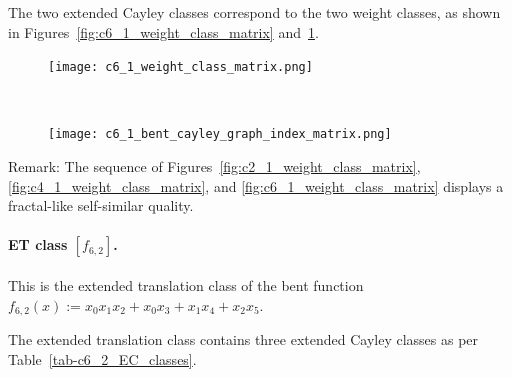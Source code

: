 \documentclass[12pt,a4paper]{article}
\begin{document}

The two extended Cayley classes correspond to the two weight classes,
as shown in Figures~\ref{fig:c6_1_weight_class_matrix} and~\ref{fig:c6_1_bent_cayley_graph_index_matrix}.

\begin{figure}[!bhpt] %
\centering
\begin{minipage}{.48\textwidth}
  \centering
  \texttt{[image: c6\_1\_weight\_class\_matrix.png]}
  \label{fig:c6_1_weight_class_matrix}
\end{minipage}%
~~~~
\begin{minipage}{.48\textwidth}
  \centering
  \texttt{[image: c6\_1\_bent\_cayley\_graph\_index\_matrix.png]}
  \label{fig:c6_1_bent_cayley_graph_index_matrix}
\end{minipage}
\end{figure}

Remark: The sequence of Figures~\ref{fig:c2_1_weight_class_matrix}, \ref{fig:c4_1_weight_class_matrix},
and \ref{fig:c6_1_weight_class_matrix} displays a fractal-like self-similar quality.

\paragraph*{ET class $[f_{6,2}]$.}
%
This is the extended translation class of the bent function
$f_{6,2}(x) := x_{0} x_{1} x_{2} + x_{0} x_{3} + x_{1} x_{4} + x_{2} x_{5}$.

The extended translation class contains three extended Cayley classes as per Table~\ref{tab-c6_2_EC_classes}.
\end{document}
